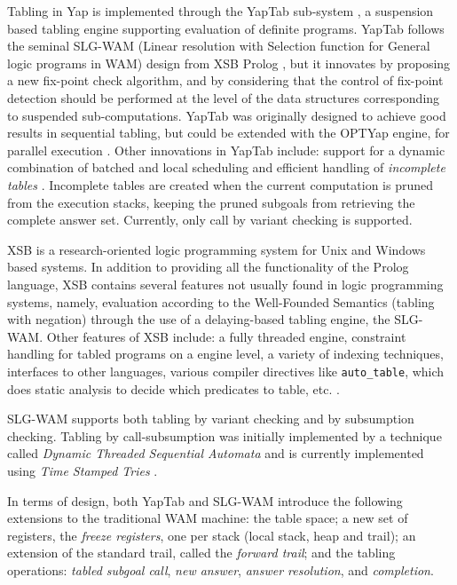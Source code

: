   Tabling in Yap is implemented through the YapTab sub-system \cite{Rocha-05a}, a suspension based tabling engine supporting evaluation of
  definite programs. YapTab follows the seminal SLG-WAM (Linear resolution with Selection function for General logic programs in WAM)
  design from XSB Prolog \cite{Sagonas-96, Sagonas-98},
  but it innovates by proposing a new fix-point check algorithm, and by considering that the control of fix-point detection should be
  performed at the level of the data structures corresponding to suspended sub-computations. YapTab was originally designed to achieve
  good results in sequential tabling, but could be extended with the OPTYap engine, for parallel execution \cite{Rocha-05a}.
  Other innovations in YapTab include: support for a dynamic combination of batched and local scheduling \cite{Rocha-05c}
  and efficient handling of \textit{incomplete tables} \cite{Rocha-06b}. Incomplete tables are created when the current computation is pruned from the execution stacks, keeping the pruned subgoals from retrieving
  the complete answer set. Currently, only call by variant checking is supported.
  
  XSB is a research-oriented logic programming system for Unix and Windows based systems. In addition to providing all
  the functionality of the Prolog language, XSB contains several features not usually found in logic programming systems,
  namely, evaluation according to the Well-Founded Semantics (tabling with negation) \cite{Gelder-91} through the use of
  a delaying-based tabling engine, the SLG-WAM.
  Other features of XSB include: a fully threaded engine, constraint handling for tabled programs on a engine level, a variety of indexing
  techniques, interfaces to other languages, various compiler directives like \texttt{auto\_table}, which does static
  analysis to decide which predicates to table, etc. \cite{system-xsb}.
  
  SLG-WAM supports both tabling by variant checking and by subsumption checking.
  Tabling by call-subsumption was initially implemented by a technique called
  \textit{Dynamic Threaded Sequential Automata} \cite{Rao-96} and is currently
  implemented using \textit{Time Stamped Tries} \cite{Johnson-99}.

  In terms of design, both YapTab and SLG-WAM introduce the following extensions to the traditional WAM machine:
  the table space; a new set of registers, the \textit{freeze registers}, one per stack (local stack, heap and trail);
  an extension of the standard trail,
  called the \textit{forward trail}; and the tabling operations: \textit{tabled subgoal call},
  \textit{new answer}, \textit{answer resolution}, and \textit{completion}.


